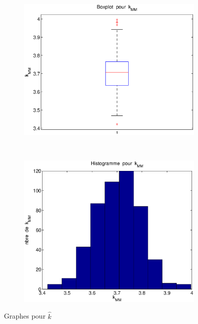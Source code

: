 \begin{figure}[!ht]
        \centering
        \begin{subfigure}[b]{0.4\textwidth}
                \includegraphics[width=\textwidth]{graphes/boxplot_kmm.eps}
        \end{subfigure}%
        ~
        \begin{subfigure}[b]{0.4\textwidth}
                \includegraphics[width=\textwidth]{graphes/hist_kmm.eps}
        \end{subfigure}
        \caption{Graphes pour $\hat{k}$}\label{fig:kmm}
\end{figure}

